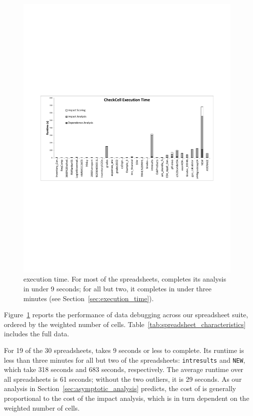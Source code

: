 \begin{figure}[!t]
\centering
\includegraphics[width=5.5in]{execution_time_graph}
  \caption{\checkcell{} execution time. For most of the spreadsheets, \checkcell{} completes its analysis in under 9 seconds; for all but two, it completes in under three minutes (see Section~\ref{sec:execution_time}).\label{fig:execution_time_graph}}
\end{figure}
 
Figure~\ref{fig:execution_time_graph} reports the performance of data
debugging across our spreadsheet suite, ordered by the weighted number
of cells. Table~\ref{tab:spreadsheet_characteristics} includes the full data.

For 19 of the 30 spreadsheets, \checkcell{} takes 9 seconds or less to
complete. Its runtime is less than three minutes for all but two of
the spreadsheets: \texttt{intresults} and \texttt{NEW}, which take 318
seconds and 683 seconds, respectively. The average runtime over all
spreadsheets is 61 seconds; without the two outliers, it is 29
seconds. As our analysis in Section~\ref{sec:asymptotic_analysis}
predicts, the cost of \checkcell{} is generally proportional to the
cost of the impact analysis, which is in turn dependent on the
weighted number of cells.

